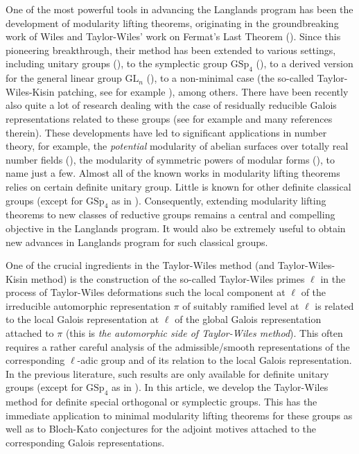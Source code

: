 \documentclass[12pt,oneside,reqno]{amsart}
\theoremstyle{plain}
\begin{document}
	
	One of the most powerful tools in advancing the Langlands program has been the development of modularity lifting theorems, originating in the groundbreaking work of Wiles and Taylor-Wiles' work on Fermat's Last Theorem (\cite{Wiles1995,TaylorWiles1995}). Since this pioneering breakthrough, their method has been extended to various settings, including unitary groups (\cite{ClozelHarrisTaylor2008,Geraghty2019,Guerberoff2011}), to the symplectic group $\mathrm{GSp}_4$ (\cite{Pilloni2012}), to a derived version for the general linear group $\mathrm{GL}_n$ (\cite{CalegariGeraghty2018}), to a non-minimal case (the so-called Taylor-Wiles-Kisin patching, see for example \cite{Kisin2009,Kisin2009b}), among others. There have been recently also quite a lot of research dealing with the case of residually reducible Galois representations related to these groups  (see for example \cite{NewtonThorne2023} and many references therein). These developments have led to significant applications in number theory, for example, the \emph{potential} modularity of abelian surfaces over totally real number fields (\cite{BoxerCalegariGeePilloni2021}), the modularity of symmetric powers of modular forms (\cite{NewtonThorne}), to name just a few. Almost all of the known works in modularity lifting theorems relies on certain definite unitary group. Little is known for other definite classical groups (except for $\mathrm{GSp}_4$ as in \cite{Pilloni2012}). Consequently, extending modularity lifting theorems to new classes of reductive groups remains a central and compelling objective in the Langlands program. It would also be extremely useful to obtain new advances in Langlands program for such classical groups.
	
	
	One of the crucial ingredients in the Taylor-Wiles method (and Taylor-Wiles-Kisin method) is the construction of the so-called Taylor-Wiles primes $\ell$ in the process of Taylor-Wiles deformations such the local component at $\ell$ of the irreducible automorphic representation $\pi$ of suitably ramified level at $\ell$ is related to the local Galois representation at $\ell$ of the global Galois representation attached to $\pi$ (this is \emph{the automorphic side of Taylor-Wiles method}). This often requires a rather careful analysis of the admissible/smooth representations of the corresponding $\ell$-adic group and of its relation to the local Galois representation. In the previous literature, such results are only available for definite unitary groups (except for $\mathrm{GSp}_4$ as in \cite{Pilloni2012}). In this article, we develop the Taylor-Wiles method for definite special orthogonal or symplectic groups. This has the immediate application to minimal modularity lifting theorems for these groups as well as to Bloch-Kato conjectures for the adjoint motives attached to the corresponding Galois representations.
	
\end{document}
